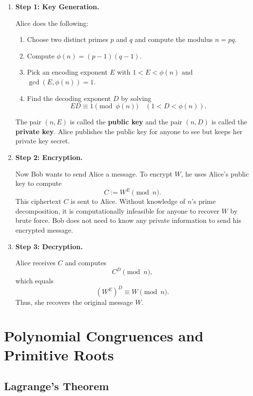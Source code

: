 \documentclass{article}
\theoremstyle{definition}
\begin{document}
\begin{enumerate}
	\item \textbf{Step 1: Key Generation.}

	      Alice does the following:
	      \begin{enumerate}
		      \item Choose two distinct primes $p$ and $q$ and compute the modulus $n = pq$.
		      \item Compute $\phi(n) = (p - 1)(q - 1)$.
		      \item Pick an encoding exponent $E$ with $1 < E < \phi(n)$ and $\gcd(E, \phi(n)) = 1$.
		      \item Find the decoding exponent $D$ by solving
		            \[
			            ED \equiv 1 \pmod{\phi(n)} \quad (1 < D < \phi(n)).
		            \]
	      \end{enumerate}

	      The pair $(n, E)$ is called the \textbf{public key} and the pair $(n, D)$ is called the \textbf{private key}.
	      Alice publishes the public key for anyone to see but keeps her private key secret.

	\item \textbf{Step 2: Encryption.}

	      Now Bob wants to send Alice a message.
	      To encrypt $W$, he uses Alice’s public key to compute
	      \[
		      C := W^{E} \pmod{n}.
	      \]
	      This ciphertext $C$ is sent to Alice.
	      Without knowledge of $n$'s prime decomposition, it is computationally infeasible for anyone to recover $W$ by brute force.
	      Bob does not need to know any private information to send his encrypted message.

	\item \textbf{Step 3: Decryption.}

	      Alice receives $C$ and computes
	      \[
		      C^{D} \pmod{n},
	      \]
	      which equals
	      \[
		      (W^{E})^{D} \equiv W \pmod{n}.
	      \]
	      Thus, she recovers the original message $W$.
\end{enumerate}

\section{Polynomial Congruences and Primitive Roots}

\subsection{Lagrange’s Theorem}
\end{document}
